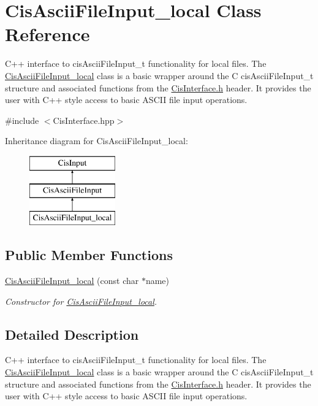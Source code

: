 \hypertarget{classCisAsciiFileInput__local}{}\section{Cis\+Ascii\+File\+Input\+\_\+local Class Reference}
\label{classCisAsciiFileInput__local}


C++ interface to cis\+Ascii\+File\+Input\+\_\+t functionality for local files. The \mbox{\hyperlink{classCisAsciiFileInput__local}{Cis\+Ascii\+File\+Input\+\_\+local}} class is a basic wrapper around the C cis\+Ascii\+File\+Input\+\_\+t structure and associated functions from the \mbox{\hyperlink{CisInterface_8h_source}{Cis\+Interface.\+h}} header. It provides the user with C++ style access to basic A\+S\+C\+II file input operations.  




{\ttfamily \#include $<$Cis\+Interface.\+hpp$>$}

Inheritance diagram for Cis\+Ascii\+File\+Input\+\_\+local\+:\begin{figure}[H]
\begin{center}
\leavevmode
\includegraphics[height=3.000000cm]{classCisAsciiFileInput__local}
\end{center}
\end{figure}
\subsection*{Public Member Functions}
\begin{DoxyCompactItemize}
\item 
\mbox{\hyperlink{classCisAsciiFileInput__local_a6a503a34514e6c0bd5ba6429393b2629}{Cis\+Ascii\+File\+Input\+\_\+local}} (const char $\ast$name)
\begin{DoxyCompactList}\small\item\em Constructor for \mbox{\hyperlink{classCisAsciiFileInput__local}{Cis\+Ascii\+File\+Input\+\_\+local}}. \end{DoxyCompactList}\end{DoxyCompactItemize}


\subsection{Detailed Description}
C++ interface to cis\+Ascii\+File\+Input\+\_\+t functionality for local files. The \mbox{\hyperlink{classCisAsciiFileInput__local}{Cis\+Ascii\+File\+Input\+\_\+local}} class is a basic wrapper around the C cis\+Ascii\+File\+Input\+\_\+t structure and associated functions from the \mbox{\hyperlink{CisInterface_8h_source}{Cis\+Interface.\+h}} header. It provides the user with C++ style access to basic A\+S\+C\+II file input operations. 

